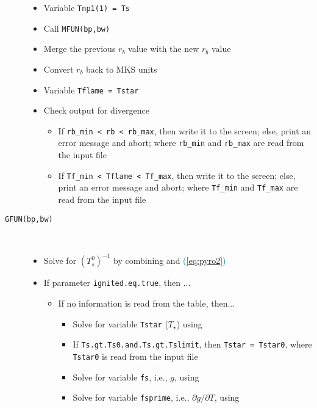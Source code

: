 \begin{description}
{\begin{itemize}
\item{Variable \texttt{Tnp1(1) = Ts}}
\item{Call \texttt{MFUN(bp,bw)}}
\item{Merge the previous $r_b$ value with the new $r_b$ value}
\item{Convert $r_b$ back to MKS units}
\item{Variable \texttt{Tflame = Tstar}}
\item{Check output for divergence}
	\begin{itemize}
		\item{If \texttt{rb\_min < rb < rb\_max}, then write it to the screen; else, print an error message and abort; where \texttt{rb\_min} and \texttt{rb\_max} are read from the input file}
		\item{If \texttt{Tf\_min < Tflame < Tf\_max}, then write it to the screen; else, print an error message and abort; where \texttt{Tf\_min} and \texttt{Tf\_max} are read from the input file}
	\end{itemize}

\end{itemize}
}

\item[\texttt{GFUN(bp,bw)}]{\hfill \\ \vspace{-15pt}
\begin{itemize}
\item{Solve for $(T_s^0)^{-1}$ by combining  and \textcolor{teal}{(\ref{eq:pyro2})}}

\item{If parameter \texttt{ignited.eq.true}, then ...}
	\begin{itemize}
	
		\item{If no information is read from the table, then...}

			\begin{itemize}
			
				\item{Solve for variable \texttt{Tstar} ($T_\star$) using }
				\item{If \texttt{Ts.gt.Ts0.and.Ts.gt.Tslimit}, then \texttt{Tstar = Tstar0}, where \texttt{Tstar0} is read from the input file}
				\item{Solve for variable \texttt{fs}, i.e., $g$, using }
				\item{Solve for variable \texttt{fsprime}, i.e., $\partial g/\partial T$, using }
			

\end{itemize}
\end{itemize}
\end{itemize}}
\end{description}
